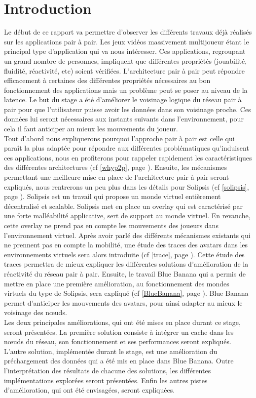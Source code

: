 \section{Introduction}
	Le début de ce rapport va permettre d'observer les différents travaux déjà réalisés sur les applications pair à pair. Les jeux vidéos massivement multijoueur étant le principal type d'application qui va nous intéresser. Ces applications, regroupant un grand nombre de personnes, impliquent que différentes propriétés (jouabilité, fluidité, réactivité, etc) soient vérifiées. L'architecture pair à pair peut répondre efficacement à certaines des différentes propriétés nécessaires au bon fonctionnement des applications mais un problème peut se poser au niveau de la latence. Le but du stage a été d'améliorer le voisinage logique du réseau pair à pair pour que l'utilisateur puisse avoir les données dans son voisinage proche. Ces données lui seront nécessaires aux instants suivants dans l'environnement, pour cela il faut anticiper au mieux les mouvements du joueur.\\

	Tout d'abord nous expliquerons pourquoi l'approche pair à pair est celle qui paraît la plus adaptée pour répondre aux différentes problématiques qu'induisent ces applications, nous en profiterons pour rappeler rapidement les caractéristiques des différentes architectures (cf \ref{whyp2p}, page \pageref{whyp2p}). Ensuite, les mécanismes permettant une meilleure mise en place de l'architecture pair à pair seront expliqués, nous rentrerons un peu plus dans les détails pour Solipsis (cf \ref{solipsis}, page \pageref{solipsis}). Solipsis est un travail qui propose un monde virtuel entièrement décentralisé et scalable. Solipsis met en place un overlay qui est caractérisé par une forte malléabilité applicative, sert de support au monde virtuel. En revanche, cette overlay ne prend pas en compte les mouvements des joueurs dans l'environnement virtuel. Après avoir parlé des différents mécanismes existants qui ne prennent pas en compte la mobilité, une étude des traces des avatars dans les environnements virtuels sera alors introduite (cf \ref{trace}, page \pageref{trace}). Cette étude des traces permettra de mieux expliquer les différentes solutions d'amélioration de la réactivité du réseau pair à pair. Ensuite, le travail Blue Banana qui a permis de mettre en place une première amélioration, au fonctionnement des mondes virtuels du type de Solipsis, sera expliqué (cf \ref{BlueBanana}, page \pageref{BlueBanana}). Blue Banana permet d'anticiper les mouvements des avatars, pour ainsi adapter au mieux le voisinage des nœuds. \\

	
	Les deux principales améliorations, qui ont été mises en place durant ce stage, seront présentées. La première solution consiste à intégrer un cache dans les nœuds du réseau, son fonctionnement et ses performances seront expliqués. L'autre solution, implémentée durant le stage, est une amélioration du préchargement des données qui a été mis en place dans Blue Banana. Outre l'interprétation des résultats de chacune des solutions, les différentes implémentations explorées seront présentées. Enfin les autres pistes d'amélioration, qui ont été envisagées, seront expliquées.

